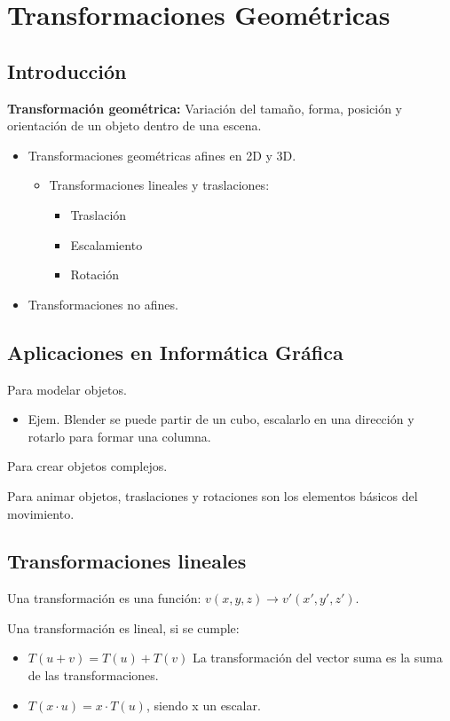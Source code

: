 \chapter{Transformaciones Geométricas}
\section{Introducción}
\textbf{Transformación geométrica:} Variación del tamaño, forma, posición y orientación de un objeto dentro de una escena.
\begin{itemize}
	\item Transformaciones geométricas afines en 2D y 3D.
	      \begin{itemize}
		      \item Transformaciones lineales y traslaciones:
		            \begin{itemize}
			            \item Traslación
			            \item Escalamiento
			            \item Rotación
		            \end{itemize}
	      \end{itemize}
	\item Transformaciones no afines.
\end{itemize}

\section{Aplicaciones en Informática Gráfica}
Para modelar objetos.
\begin{itemize}
	\item Ejem. Blender se puede partir de un cubo, escalarlo en una dirección y rotarlo para formar una columna.
\end{itemize}

Para crear objetos complejos.

Para animar objetos, traslaciones y rotaciones son los elementos básicos del movimiento.

\section{Transformaciones lineales}
Una transformación es una función: $v(x,y,z) \rightarrow v'(x',y',z')$.

Una transformación es lineal, si se cumple:
\begin{itemize}
	\item $T(u+v) = T(u) + T(v)$ La transformación del vector suma es la suma de las transformaciones.
	\item $T(x\cdot u) = x\cdot T(u)$, siendo x un escalar.
\end{itemize}

